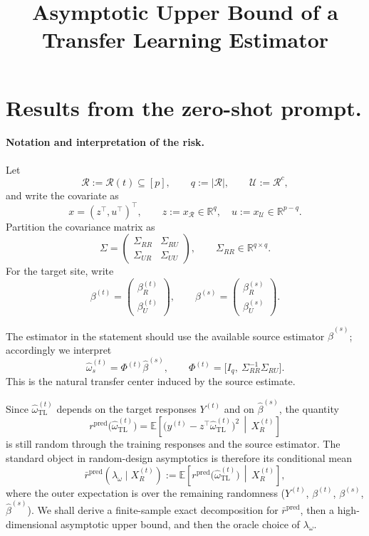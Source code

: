 \documentclass[11pt]{article}
\title{Asymptotic Upper Bound of a Transfer Learning Estimator}
\newcommand{\1}{\mathbf{1}}
\begin{document}
\section{Results from the zero-shot prompt.}
\paragraph{Notation and interpretation of the risk.}
Let
\[
\mathcal R:=\mathcal R(t)\subseteq [p],\qquad q:=|\mathcal R|,\qquad \mathcal U:=\mathcal R^c,
\]
and write the covariate as
\[
x=(z^\top,u^\top)^\top,\qquad z:=x_{\mathcal R}\in\mathbb R^q,\quad u:=x_{\mathcal U}\in\mathbb R^{p-q}.
\]
Partition the covariance matrix as
\[
\Sigma=
\begin{pmatrix}
\Sigma_{RR}&\Sigma_{RU}\\
\Sigma_{UR}&\Sigma_{UU}
\end{pmatrix},
\qquad \Sigma_{RR}\in\mathbb R^{q\times q}.
\]
For the target site, write
\[
\beta^{(t)}=
\begin{pmatrix}
\beta_R^{(t)}\\
\beta_U^{(t)}
\end{pmatrix},
\qquad
\beta^{(s)}=
\begin{pmatrix}
\beta_R^{(s)}\\
\beta_U^{(s)}
\end{pmatrix}.
\]

The estimator in the statement should use the available source estimator \(\hat\beta^{(s)}\); accordingly we interpret
\[
\hat\omega_s^{(t)}=\Phi^{(t)}\hat\beta^{(s)},
\qquad
\Phi^{(t)}=\bigl[I_q,\ \Sigma_{RR}^{-1}\Sigma_{RU}\bigr].
\]
This is the natural transfer center induced by the source estimate.

Since \(\hat\omega_{\mathrm{TL}}^{(t)}\) depends on the target responses \(Y^{(t)}\) and on \(\hat\beta^{(s)}\), the quantity
\[
r^{\mathrm{pred}}\!\bigl(\hat\omega_{\mathrm{TL}}^{(t)}\bigr)
=
\mathbb E\!\left[
\bigl(y^{(t)}-z^\top\hat\omega_{\mathrm{TL}}^{(t)}\bigr)^2
\,\middle|\,
X_R^{(t)}
\right]
\]
is still random through the training responses and the source estimator. The standard object in random-design asymptotics is therefore its conditional mean
\[
\bar r^{\mathrm{pred}}(\lambda_\omega\mid X_R^{(t)})
:=
\mathbb E\!\left[
r^{\mathrm{pred}}\!\bigl(\hat\omega_{\mathrm{TL}}^{(t)}\bigr)
\,\middle|\,
X_R^{(t)}
\right],
\]
where the outer expectation is over the remaining randomness
(\(Y^{(t)}\), \(\beta^{(t)}\), \(\beta^{(s)}\), \(\hat\beta^{(s)}\)).
We shall derive a finite-sample exact decomposition for \(\bar r^{\mathrm{pred}}\), then a high-dimensional asymptotic upper bound, and then the oracle choice of \(\lambda_\omega\).
\end{document}
